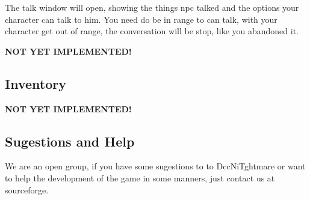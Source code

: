 \documentclass[ letterpaper,12pt]{article}
\begin{document}
The talk window will open, showing the things npc talked and the options your character can talk to him. You need do be in range to can talk, with your character get out of range, the conversation will be stop, like you abandoned it.

{\bf NOT YET IMPLEMENTED!}

\subsection{Inventory}

{\bf NOT YET IMPLEMENTED!}

\subsection{Sugestions and Help}

We are an open group, if you have some sugestions to to DccNiTghtmare or want to help the development of the game in some manners, just contact us at sourceforge.
\end{document}
